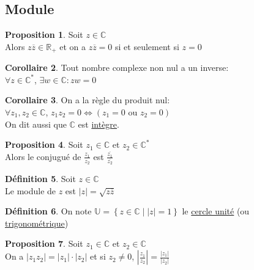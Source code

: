 \documentclass[10pt,a4paper]{article}
\theoremstyle{definition}
\newtheorem{proposition}{Proposition}[section]
\newtheorem{corollaire}[proposition]{Corollaire}
\newtheorem{definition}[proposition]{Définition}
\begin{document}
\subsection{Module}
\begin{proposition}
Soit $z \in \mathbb{C}$ \\
Alors $z \overline{z} \in \mathbb{R}_+$ et on a $z \overline{z} = 0$ si et seulement si $z = 0$
\end{proposition}
\begin{corollaire}
Tout nombre complexe non nul a un inverse: \\
$\forall z \in \mathbb{C}^*$, $\exists w \in \mathbb{C}: zw = 0$
\end{corollaire}
\begin{corollaire}
On a la règle du produit nul: \\
$\forall z_1, z_2 \in \mathbb{C}$, $z_1 z_2 = 0 \iff (z_1 = 0 \text{ ou } z_2 = 0)$ \\
On dit aussi que $\mathbb{C}$ est \uline{intègre}.
\end{corollaire}
\begin{proposition}
Soit $z_1 \in \mathbb{C}$ et $z_2 \in \mathbb{C}^*$ \\
Alors le conjugué de $\frac{z_1}{z_2}$ est $\frac{\overline{z_1}}{\overline{z_2}}$
\end{proposition}
\begin{definition}
Soit $z \in \mathbb{C}$ \\
Le module de $z$ est $\left| z \right| = \sqrt{z \overline{z}}$
\end{definition}
\begin{definition}
On note $\mathbb{U} = \left\{ z \in \mathbb{C} \mid \left|z\right| = 1 \right\}$ le \uline{cercle unité} (ou \uline{trigonométrique})
\end{definition}
\begin{proposition}
Soit $z_1 \in \mathbb{C}$ et $z_2 \in \mathbb{C}$ \\
On a $\left| z_1 z_2 \right| = |z_1| \cdot |z_2|$ et si $z_2 \neq 0$, $\left|\frac{z_1}{z_2}\right| = \frac{|z_1|}{|z_2|}$
\end{proposition}
\end{document}
